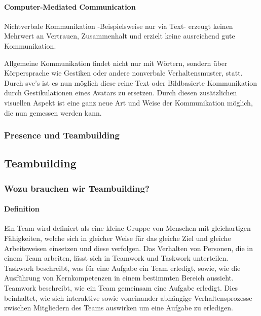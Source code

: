 \documentclass[a4paper,11pt]{article}%
\renewcommand{\\}{\vspace*{0.5\baselineskip} \newline}
\begin{document}
{			\paragraph{Computer-Mediated Communication}
			Nichtverbale Kommunikation -Beispielsweise nur via Text- erzeugt keinen Mehrwert an Vertrauen, Zusammenhalt und erzielt keine ausreichend gute Kommunikation. \citep[p.81]{haslam2003social}
			
			Allgemeine Kommunikation findet nicht nur mit Wörtern, sondern über Körpersprache wie Gestiken oder andere nonverbale Verhaltensmuster, statt. Durch \ac{sve}'s ist es nun möglich diese reine Text oder Bildbasierte Kommunikation durch Gestikulationen eines Avatars zu ersetzen. Durch diesen zusätzlichen visuellen Aspekt ist eine ganz neue Art und Weise der Kommunikation möglich, die nun gemessen werden kann.
			
			\subsubsection{Presence und Teambuilding}
	
	\newpage
		\subsection{Teambuilding}		
		
		\subsubsection{Wozu brauchen wir Teambuilding?}
		\paragraph{Definition}
	Ein Team wird definiert als eine kleine Gruppe von Menschen mit gleichartigen Fähigkeiten, welche sich in gleicher Weise für das gleiche Ziel und gleiche Arbeitsweisen einsetzen und diese verfolgen.\citep[p. 2]{zenun2007effects}
	\\
Das Verhalten von Personen, die in einem Team arbeiten, lässt sich in \glqq Teamwork \grqq und \glqq Taskwork \grqq unterteilen. \citep[p. 541-542]{rousseau2006teamwork} Taskwork beschreibt, was für eine Aufgabe ein Team erledigt, sowie, wie die Ausführung von Kernkompetenzen in einem bestimmten Bereich aussieht. Teamwork beschreibt, wie ein Team gemeinsam eine Aufgabe erledigt. Dies beinhaltet, wie sich interaktive sowie voneinander abhängige Verhaltensprozesse zwischen Mitgliedern des Teams auswirken um eine Aufgabe zu erledigen. \citep[p. 357]{marks2001temporally} 
		
}
\end{document}
